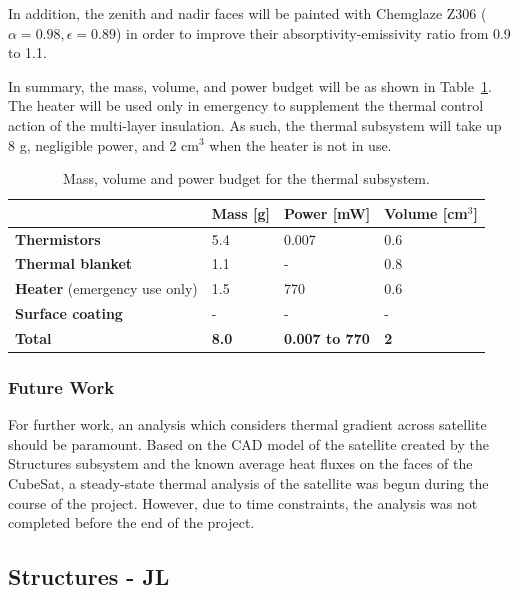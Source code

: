 \documentclass[12pt]{article}
\begin{document}
In addition, the zenith and nadir faces will be painted with Chemglaze Z306 ($\alpha= 0.98, \epsilon = 0.89$) in order to improve their absorptivity-emissivity ratio from 0.9 to 1.1.

In summary, the mass, volume, and power budget will be as shown in Table~\ref{table:thermal-outputs}.  The heater will be used only in emergency to supplement the thermal control action of the multi-layer insulation. As such, the thermal subsystem will take up 8 g, negligible power, and 2 cm$^3$ when the heater is not in use.

\begin{table}[ht]%
\centering
\caption{Mass, volume and power budget for the thermal subsystem.}
\label{table:thermal-outputs}
\begin{tabular}{|l|l|l|l|}\hline
& \textbf{Mass} [g] & \textbf{Power} [mW] & \textbf{Volume} [cm$^3$] \\\hline
\textbf{Thermistors} & 5.4 & 0.007 & 0.6 \\\hline
\textbf{Thermal blanket} & 1.1 & -  & 0.8 \\\hline
\textbf{Heater} (emergency use only) & 1.5 & 770 & 0.6 \\\hline
\textbf{Surface coating} & - & - & - \\\hline
\textbf{Total} & \textbf{8.0} & \textbf{0.007 to 770} & \textbf{2} \\\hline
\end{tabular}
\end{table}

\subsubsection{Future Work}

For further work, an analysis which considers thermal gradient across satellite should be paramount. Based on the CAD model of the satellite created by the Structures subsystem and the known average heat fluxes on the faces of the CubeSat, a steady-state thermal analysis of the satellite was begun during the course of the project. However, due to time constraints, the analysis was not completed before the end of the project.

\newpage
\FloatBarrier

\subsection{Structures - JL}
\end{document}
